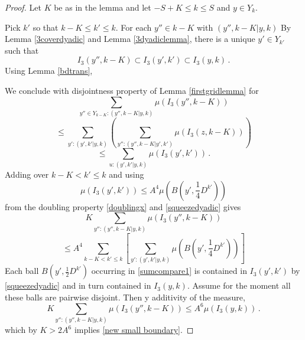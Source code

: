 \begin{proof}
Let $K$ be as in the lemma and let $-S+K\le k\le S$ and $y\in Y_k$.

Pick $k'$ so that $k-K\le k'\le k$.
For each $y''\in k-K$ with $(y'',k-K| y,k)$
By Lemma \ref{3coverdyadic} and Lemma \ref{3dyadiclemma}, there is a unique $y'\in Y_{k'}$ such that
\begin{equation}
    I_3(y'',k-K)\subset I_3(y',k')\subset I_3(y,k)\, .
\end{equation}
Using Lemma \ref{bdtrans},



We conclude with disjointness property of
Lemma \ref{firstgridlemma} for
\begin{equation}\label{scalecompare}
    \sum_{y''\in Y_{k-K}: (y'',k-K|y,k)}\mu(I_3(y'',k-K))
\end{equation}
\begin{equation}
    \le
\sum_{y': (y',k'|y,k)}\left(
 \sum_{y'': (y'',k-K|y',k')}\mu(I_3(z,k-K))\right)
\end{equation}
   \begin{equation}
   \le
\sum_{u: (y',k'|y,k)}
\mu(I_3(y',k'))    \, .
   \end{equation}
Adding over $k-K<k'\le k$ and using
\[\mu(I_3(y',k'))\le A^4 \mu(B(y', \frac 14 D^{k'}))\]
from the doubling property \eqref{doublingx} and
\eqref{squeezedyadic} gives
\begin{equation}\label{sumcompare}
    K\sum_{y'': (y'',k-K|y,k)}
    \mu(I_3(y'',k-K))
\end{equation}
\begin{equation}\label{sumcompare1}
    \le A^4 \sum_{k-K<k'\le k}
   \left[ \sum_{y': (y',k'|y,k)}
\mu(B(y', \frac 14 D^{k'}))\right]
\end{equation}
Each ball $B(y', \frac 12 D^{k'})$ occurring in
\eqref{sumcompare1} is contained in $I_3(y',k')$
by \eqref{squeezedyadic} and in turn contained in
$I_3(y,k)$. Assume for the moment all these balls are pairwise disjoint. Then
y additivity of the measure,
\begin{equation}
    K\sum_{y'': (y'',k-K|y,k)}
    \mu(I_3(y'',k-K))
    \le A^6
\mu(I_3(y,k))\, .
\end{equation}
which by $K>2A^6$ implies \eqref{new small boundary}.


\end{proof}
